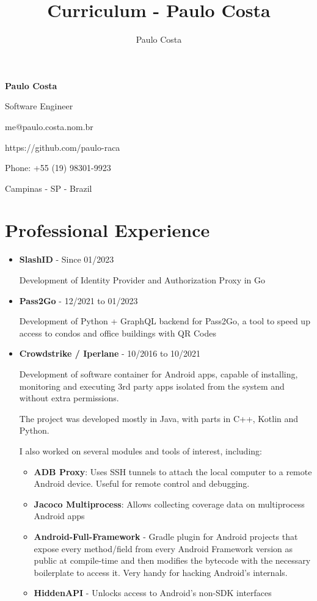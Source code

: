 \documentclass[a4paper,10pt]{article}
\title{Curriculum - Paulo Costa}
\author{Paulo Costa}
\begin{document}
  \LARGE\textbf{Paulo Costa}

  \large Software Engineer

  \large me@paulo.costa.nom.br
  
  \large https://github.com/paulo-raca

  \large Phone: +55 (19) 98301-9923

  \large Campinas - SP - Brazil

  \normalsize 
  
  \section{Professional Experience}
    \begin{itemize}
      \item
        \textbf{SlashID} - Since 01/2023

        Development of Identity Provider and Authorization Proxy in Go

      \item
        \textbf{Pass2Go} - 12/2021 to 01/2023

        Development of Python + GraphQL backend for Pass2Go, a tool to speed up access to condos and office buildings with QR Codes

      \item
        \textbf{Crowdstrike / Iperlane} - 10/2016 to 10/2021

        Development of software container for Android apps, capable of installing, monitoring and executing 3rd
        party apps isolated from the system and without extra permissions.
        
        The project was developed mostly in Java, with parts in C++, Kotlin and Python.

        I also worked on several modules and tools of interest, including:

        \begin{itemize}
          \item \textbf{ADB Proxy}: Uses SSH tunnels to attach the local computer to a remote Android device. Useful for remote control and debugging.
          \item \textbf{Jacoco Multiprocess}: Allows collecting coverage data on multiprocess Android apps
          \item \textbf{Android-Full-Framework} - Gradle plugin for Android projects that expose every method/field from every Android Framework version as public at compile-time and then modifies the bytecode with the necessary boilerplate to access it. Very handy for hacking Android's internals.
          \item \textbf{HiddenAPI} - Unlocks access to Android's non-SDK interfaces
        \end{itemize}


\end{itemize}
\end{document}
